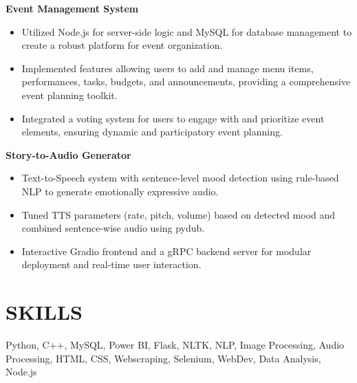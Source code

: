 \documentclass[a4paper,10pt]{article}
\begin{document}
\textbf{ Event Management System }\\[-0.3em]
\begin{itemize}[leftmargin=1em, noitemsep, topsep=0pt, partopsep=0pt, parsep=0pt]

    \item Utilized Node.js for server-side logic and MySQL for database management to create a robust platform for event organization.

    \item Implemented features allowing users to add and manage menu items, performances, tasks, budgets, and announcements, providing a comprehensive event planning toolkit.

    \item Integrated a voting system for users to engage with and prioritize event elements, ensuring dynamic and participatory event planning.

\end{itemize}\vspace{0.3em} %

\textbf{ Story-to-Audio Generator }\\[-0.3em]
\begin{itemize}[leftmargin=1em, noitemsep, topsep=0pt, partopsep=0pt, parsep=0pt]

    \item Text-to-Speech system with sentence-level mood detection using rule-based NLP to generate emotionally expressive audio.

    \item Tuned TTS parameters (rate, pitch, volume) based on detected mood and combined sentence-wise audio using pydub.

    \item Interactive Gradio frontend and a gRPC backend server for modular deployment and real-time user interaction.

\end{itemize}\vspace{0.3em} %


\section*{SKILLS}

Python, C++, MySQL, Power BI, Flask, NLTK, NLP, Image Processing, Audio Processing, HTML, CSS, Webscraping, Selenium, WebDev, Data Analysis, Node.js
\end{document}
